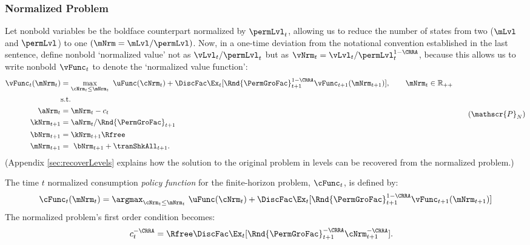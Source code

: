 \documentclass[BufferStockTheory]{subfiles}
\begin{document}
\hypertarget{The-Problem-Can-Be-Rewritten-in-Ratio-Form}{}
\hypertarget{The-Problem-Can-Be-Normalized-By-Permanent-Income}{}
\subsubsection{Normalized Problem}\label{subsubsec:ratio}

Let nonbold variables be the boldface counterpart normalized by $\permLvl_{t}$, allowing us to reduce the number of states from two ($\mLvl$ and $\permLvl$) to one $(\mNrm = \mLvl/\permLvl)$.  Now, in a one-time deviation from the notational convention established in the last sentence, define nonbold `normalized value' not as $\vLvl_{t}/\permLvl_{t}$ but as $\vNrm_{t} = \vLvl_{t}/\permLvl_{t}^{1-\CRRA}$, because this allows us to write nonbold $\vFunc_{t}$ to denote the `normalized value function':
%
%
\begin{equation}\label{eq:veqnNrmRecBellman}
  \begin{split}
    \vFunc_{t}(\mNrm_{t})  & = \max_{\cNrm_{t}\leq \mNrm_{t}}~  \uFunc(\cNrm_{t}) +\DiscFac \Ex_{t}[\Rnd{\PermGroFac}_{t+1}^{1-\CRRA}\vFunc_{t+1}({\mNrm}_{t+1})],\qquad  \mNrm_{t}\in \mathbb{R}_{++}\\
    & \mbox{s.t.}
    \\ {\aNrm}_{t}  & = \mNrm_{t}-c_{t}
    \\ {\kNrm}_{t+1} & = \aNrm_{t}/\Rnd{\PermGroFac}_{t+1} %
    \\ {\bNrm}_{t+1} & = \kNrm_{t+1} \Rfree %
    \\ \mNrm_{t+1}  & = ~ \bNrm_{t+1} +\tranShkAll_{t+1} .
  \end{split}  \tag{$\mathscr{P}_{N}$}
\end{equation}
(Appendix \ref{sec:recoverLevels} explains how the solution to the original problem in levels can be recovered from the normalized problem.)

The time $t$ normalized consumption \textit{policy function} for the finite-horizon problem, $\cFunc_{t}$, is defined by:
%
%
\begin{equation}\label{eq: cfunceq1}
    \cFunc_{t}(\mNrm_{t})  = \argmax_{\cNrm_{t}\leq \mNrm_{t}}~  \uFunc(\cNrm_{t}) +\DiscFac \Ex_{t}[\Rnd{\PermGroFac}_{t+1}^{1-\CRRA}\vFunc_{t+1}(\mNrm_{t+1} )]  
\end{equation}
% 
The normalized problem's first order condition becomes:
\begin{align}
  c_{t}^{-\CRRA}  & = \Rfree \DiscFac \Ex_{t}[ \Rnd{\PermGroFac}_{t+1}^{-\CRRA} \cNrm_{t+1}^{-\CRRA}].  \label{eq:scaledeuler}
\end{align}
\end{document}
